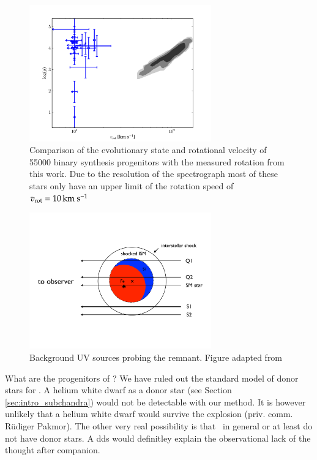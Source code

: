 \begin{figure}[tb] %
   \centering
   \includegraphics[width=0.7\textwidth]{chapter_sn1006/plots/compare_vrot.pdf} 
   \caption{Comparison of the evolutionary state and rotational velocity of 55000 binary synthesis  progenitors \citep[gray shades;data from][]{2008ApJ...677L.109H} with the measured rotation from this work. Due to the resolution of the spectrograph most of these stars only have an upper limit of the rotation speed of $\hbox{$v_{\textrm{rot}}$}=10\,\hbox{km s$^{-1}$}$}
   \label{fig:han2008_vrot_compare}
\end{figure}


\begin{figure}[htbp] %
   \centering
   \includegraphics[width=0.7\textwidth]{chapter_sn1006/plots/Winkler2005_probingsn1006_cropped.pdf} 
   \caption{Background UV sources probing the remnant. Figure adapted from \citet{2005ApJ...624..189W}}
   \label{fig:sn1006_uvprobe}
\end{figure}

What are the progenitors of \sneia? We have ruled out the standard model of donor stars for . A helium white dwarf as a donor star (see Section \ref{sec:intro_subchandra}) would not be detectable with our method. It is however unlikely that a helium white dwarf would survive the explosion (priv. comm. R\"udiger Pakmor). The other very real possibility is that \sneia\ in general or at least  do not have donor stars. A \gls{dds} would definitley explain the observational lack of the thought after companion. 

